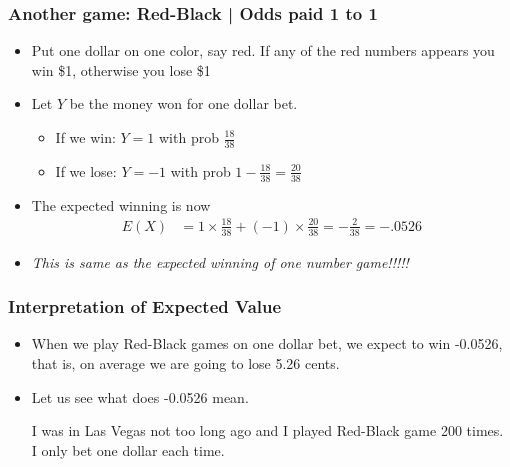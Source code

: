 \documentclass[
  ignorenonframetext,
]{beamer}
\providecommand{\tightlist}{%
  \setlength{\itemsep}{0pt}\setlength{\parskip}{0pt}}
\begin{document}
\begin{frame}
\frametitle{Another game: Red-Black | Odds paid 1 to 1}

\begin{itemize}
\item
  Put one dollar on one color, say red. If any of the red numbers
  appears you win \$1, otherwise you lose \$1
\item
  Let \(Y\) be the money won for one dollar bet.

  \begin{itemize}
  \tightlist
  \item
    If we win: \(Y = 1\) with prob \(\frac{18}{38}\)
  \item
    If we lose: \(Y = -1\) with prob
    \(1 - \frac{18}{38} = \frac{20}{38}\)
  \end{itemize}
\item
  The expected winning is now \[\begin{split}
   E(X)& = 1\times \frac{18}{38} +(-1)\times\frac{20}{38} =- \frac{2}{38} =-.0526   
   \end{split}\]
\item
  \emph{This is same as the expected winning of one number game!!!!!}
\end{itemize}
\end{frame}

\begin{frame}
\frametitle{Interpretation of Expected Value}

\begin{itemize}
\item
  When we play Red-Black games on one dollar bet, we expect to win
  -0.0526, that is, on average we are going to lose 5.26 cents.
\item
  Let us see what does -0.0526 mean.

  I was in Las Vegas not too long ago and I played Red-Black game 200
  times. I only bet one dollar each time.
\end{itemize}
\end{frame}
\end{document}
